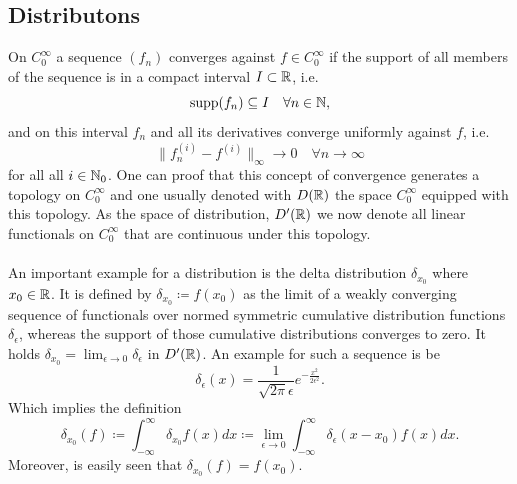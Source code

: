 \subsection*{Distributons}
	On $C_{0}^{\infty}$ a sequence $(f_{n})$ converges against $f \in C_{0}^{\infty}$ if the support of all members of the sequence is in a compact interval $I \subset \mathbb{R}$, i.e.
	$$ \operatorname{supp} (f_{n}) \subseteq I \quad \forall n \in \mathbb{N}, $$
	and on this interval $f_{n}$ and all its derivatives converge uniformly against $f$, i.e.
	\[ \| f_{n}^{(i)} - f^{(i)} \|_{\infty} \rightarrow 0 \quad \forall n \rightarrow \infty \]
	for all all $i \in \mathbb{N}_{0}$. One can proof that this concept of convergence generates a topology on $C_{0}^{\infty}$ and one usually denoted with $D(\mathbb{R})$ the space $C_{0}^{\infty}$ equipped with this topology. As the space of distribution, $D'(\mathbb{R})$ we now denote all linear functionals on $C_{0}^{\infty}$ that are continuous under this topology. %
~\\ ~\\
An important example for a distribution is the delta distribution $\delta_{x_{0}}$ where $x_{0} \in \mathbb{R}$. It is defined by $\delta_{x_{0}} \coloneqq f(x_{0})$ as the limit of a weakly converging sequence of functionals over normed symmetric cumulative distribution functions $\delta_{\epsilon}$, whereas the support of those cumulative distributions converges to zero. It holds $\delta_{x_{0}} = \lim_{\epsilon \rightarrow 0} \delta_{\epsilon}$ in $D'(\mathbb{R})$. An example for such a sequence is be %
	\[ \delta_{\epsilon}(x) = \frac{1}{\sqrt{2 \pi} \epsilon} e^{-\frac{x^{2}}{2 \epsilon^{2}}}. \]
Which implies the definition
	\[ \delta_{x_{0}}(f) \coloneqq \int_{-\infty}^{\infty} \delta_{x_{0}} f(x) dx \coloneqq \lim_{\epsilon \rightarrow 0} \int_{-\infty}^{\infty} \delta_{\epsilon}(x - x_{0}) f(x) dx. \]
Moreover, is easily seen that $\delta_{x_{0}}(f) = f(x_{0})$.

